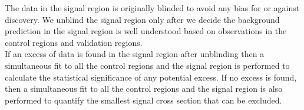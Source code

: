 \indent The data in the signal region is originally blinded to avoid any bias for or against discovery.  We unblind the signal region only after we decide the background prediction in the signal region is well understood based on observations in the control regions and validation regions. \\

\indent If an excess of data is found in the signal region after unblinding then a simultaneous fit to all the control regions and the signal region is performed to calculate the statistical significance of any potential excess.   If no excess is found, then a simultaneous fit to all the control regions and the signal region is also performed to quantify the smallest signal cross section that can be excluded.  \\
